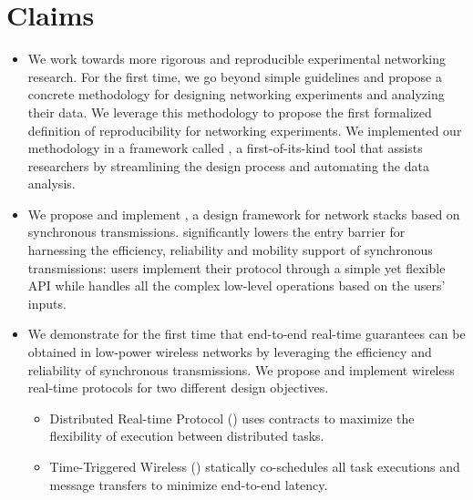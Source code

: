 


\newpage
\section*{Claims}
\begin{itemize}

  \item
  We work towards more rigorous and reproducible experimental networking research.
  For the first time, we go beyond simple guidelines and propose a concrete methodology for designing networking experiments and analyzing their data.
  We leverage this methodology to propose the first formalized definition of reproducibility for networking experiments.
  We implemented our methodology in a framework called \triscale, a first-of-its-kind tool that assists researchers by streamlining the design process and automating the data analysis.

  \item
  We propose and implement \baloo, a design framework for network stacks based on synchronous transmissions.
  \baloo significantly lowers the entry barrier for harnessing the efficiency, reliability and mobility support of synchronous transmissions:
  users implement their protocol through a simple yet flexible API while \baloo handles all the complex low-level operations based on the users' inputs.

  \item
  We demonstrate for the first time that end-to-end real-time guarantees can be obtained in low-power wireless networks by leveraging the efficiency and reliability of synchronous transmissions.
  We propose and implement wireless real-time protocols for two different design objectives.
  \begin{itemize}
    \item Distributed Real-time Protocol (\DRP) uses contracts to maximize the flexibility of execution between distributed tasks.
    \item Time-Triggered Wireless (\TTW) statically co-schedules all task executions and message transfers to minimize end-to-end latency.
  \end{itemize}

\end{itemize}
